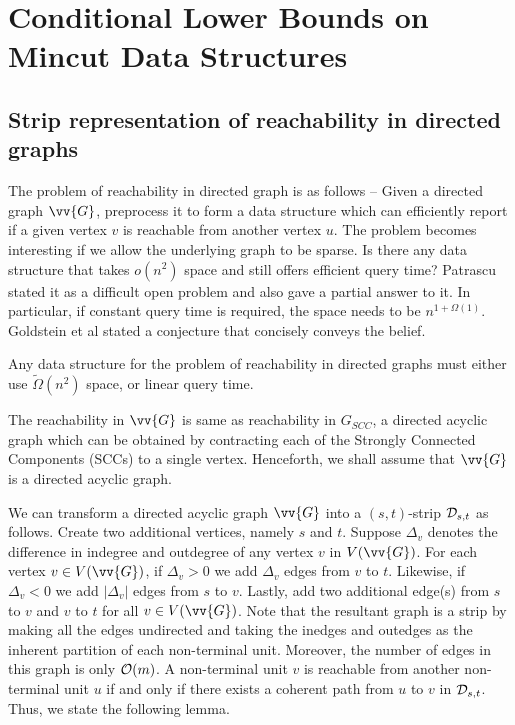 \chapter{Conditional Lower Bounds on Mincut Data Structures}

\section{Strip representation of reachability in directed graphs}

The problem of reachability in directed graph is as follows -- Given a directed graph $\vv{G}$, preprocess it to form a data structure which can efficiently report if a given vertex $v$ is reachable from another vertex $u$. The problem becomes interesting if we allow the underlying graph to be sparse. Is there any data structure that takes ${o}(n^2)$ space and still offers efficient query time? Patrascu \cite{DBLP:journals/siamcomp/Patrascu11} stated it as a difficult open problem and also gave a partial answer to it. In particular, if constant query time is required, the space needs to be $n^{1+\Omega(1)}$. Goldstein et al \cite{DBLP:conf/wads/GoldsteinKLP17} stated a conjecture that concisely conveys the belief.

\begin{conjecture}
\label{conj:directed-reachability-hypothesis}
Any data structure for the problem of reachability in directed graphs must either use ${\tilde \Omega}(n^2)$ space, or linear query time.
\end{conjecture}

The reachability in $\vv{G}$ is same as reachability in $G_{SCC}$, a directed acyclic graph which can be obtained by contracting each of the Strongly Connected Components (SCCs) to a single vertex. Henceforth, we shall assume that $\vv{G}$ is a directed acyclic graph.

We can transform a directed acyclic graph $\vv{G}$ into a $(s,t)$-strip ${\cal D}_{s,t}$ as follows. Create two additional vertices, namely $s$ and $t$. Suppose $\Delta_v$ denotes the difference in indegree and outdegree of any vertex $v$ in $V(\vv{G})$. For each vertex $v \in V(\vv{G})$, if $\Delta_v > 0$ we add $\Delta_v$ edges from $v$ to $t$. Likewise, if $\Delta_v < 0$ we add $|\Delta_v|$ edges from $s$ to $v$. Lastly, add two additional edge(s) from $s$ to $v$ and $v$ to $t$ for all $v \in V(\vv{G})$. Note that the resultant graph is a strip by making all the edges undirected and taking the inedges and outedges as the inherent partition of each non-terminal unit. Moreover, the number of edges in this graph is only ${\cal O}(m)$. A non-terminal unit $v$ is reachable from another non-terminal unit $u$ if and only if there exists a coherent path from $u$ to $v$ in ${\cal D}_{s,t}$. Thus, we state the following lemma.


